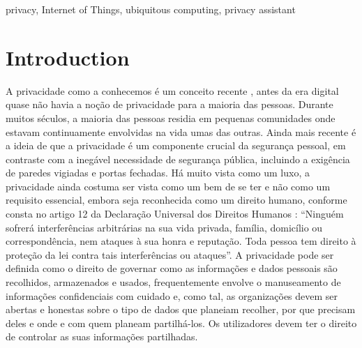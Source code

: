\documentclass[conference]{IEEEtran}
\begin{document}
\begin{IEEEkeywords}
privacy, Internet of Things, ubiquitous computing, privacy assistant
\end{IEEEkeywords}

\section{Introduction}

A privacidade como a conhecemos é um conceito recente \cite{vincent2016privacy, moore2017privacy},
antes da era digital quase não havia a noção de privacidade para a maioria das
pessoas. Durante muitos séculos, a maioria das pessoas residia em pequenas comunidades
onde estavam continuamente envolvidas na vida umas das outras. Ainda mais
recente é a ideia de que a privacidade é um componente crucial da segurança
pessoal, em contraste com a inegável necessidade de segurança pública, incluindo
a exigência de paredes vigiadas e portas fechadas. Há muito vista como um luxo,
a privacidade ainda costuma ser vista como um bem de se ter e não como um requisito
essencial, embora seja reconhecida como um direito humano, conforme consta no
artigo 12 da Declaração Universal dos Direitos Humanos \cite{RooseveltUniversal}:
``Ninguém sofrerá interferências arbitrárias na sua vida privada, família, domicílio
ou correspondência, nem ataques à sua honra e reputação. Toda pessoa tem direito à
proteção da lei contra tais interferências ou ataques''. A privacidade pode ser
definida \cite{InternationalWhat, SpiekermannEngineering} como o direito de governar
como as informações e dados pessoais são recolhidos, armazenados e usados,
frequentemente envolve o manuseamento de informações confidenciais com cuidado e, como
tal, as organizações devem ser abertas e honestas sobre o tipo de dados que planeiam
recolher, por que precisam deles e onde e com quem planeam partilhá-los. Os
utilizadores devem ter o direito de controlar as suas informações partilhadas.
\end{document}

